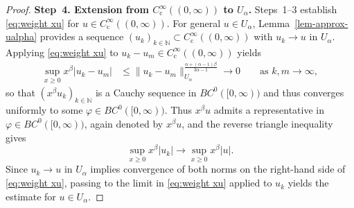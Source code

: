 \documentclass[reqno,12pt]{amsart}
\newcommand{\N}{\ensuremath{\mathbb{N}}}
\numberwithin{equation}{section}
\begin{document}
\begin{proof}
\noindent\textbf{Step~4. Extension from $C^\infty_\mathrm{c}((0,\infty))$ to $U_\alpha$.}
Steps~1--3 establish \eqref{eq:weight xu} for $u \in C^\infty_\mathrm{c}((0,\infty))$.
For general $u \in U_\alpha$, Lemma~\ref{lem-approx-ualpha} provides a sequence
$(u_k)_{k \in \N} \subset C^\infty_\mathrm{c}((0,\infty))$ with $u_k \to u$ in $U_\alpha$. Applying \eqref{eq:weight xu} to
$u_k - u_m \in C^\infty_\mathrm{c}((0,\infty))$ 
yields
%
\begin{align*}
\sup_{x \ge 0} x^\beta |u_k - u_m|
&\leq
\|u_k - u_m\|_{U_\alpha}^{\frac{\alpha+(\alpha-1)\beta}{3\alpha-1}}
\to 0 \qquad \text{as } k,m \to \infty,
\end{align*}
%
so that $(x^\beta u_k)_{k \in \N}$ is a Cauchy sequence in $BC^0([0,\infty))$ and thus converges uniformly to some
$\varphi \in BC^0([0,\infty))$. Thus $x^\beta u$ admits a representative in $\varphi \in BC^0([0,\infty))$, again
denoted by $x^\beta u$, and 
the reverse triangle inequality gives
%
\begin{equation*}
    \sup_{x \ge 0} x^\beta |u_k| \to \sup_{x \ge 0} x^\beta |u|. 
\end{equation*}
%
Since $u_k \to u$ in $U_\alpha$ implies convergence of both norms on the
right-hand side of \eqref{eq:weight xu}, passing to the limit in \eqref{eq:weight xu} applied to $u_k$ yields the estimate for $u \in U_\alpha$.
\end{proof}
%
\end{document}
